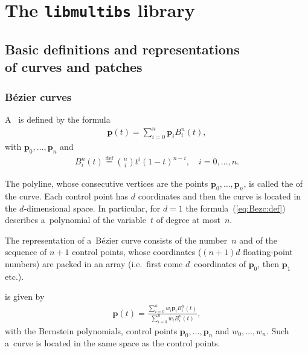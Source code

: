 

\chapter{The \texttt{libmultibs} library}

\section[Basic definitions and representations of curves and patches]%
{Basic definitions and representations \\ of curves and patches}

\subsection{B\'{e}zier curves}

A~ is defined by the formula
\begin{align}\label{eq:Bezc:def}
  \bm{p}(t) = \sum_{i=0}^n \bm{p}_iB^n_i(t),
\end{align}
with  $\bm{p}_0,\ldots,\bm{p}_n$
and 
\begin{align}
  B^n_i(t) \stackrel{\mathrm{def}}{=} \binom{n}{i}t^i(1-t)^{n-i},\quad
  i=0,\ldots,n.
\end{align}

The polyline, whose consecutive vertices are the points
$\bm{p}_0,\ldots,\bm{p}_n$, is called the  of the curve.
Each control point has $d$ coordinates and then the curve is located in the
$d$-dimensional space. In particular, for $d=1$ the formula~(\ref{eq:Bezc:def})
describes a~polynomial of the variable~$t$ of degree at most~$n$.

The representation of a~B\'{e}zier curve consists of the number~$n$
and of the sequence of $n+1$ control points, whose coordinates
($(n+1)d$ floating-point numbers) are packed in an array
(i.e.\ first come $d$~coordinates of $\bm{p}_0$, then $\bm{p}_1$ etc.).

\vspace{\medskipamount}
 is given by
\begin{align}
  \bm{p}(t) =
  \frac{\sum_{i=0}^n w_i\bm{p}_i B^n_i(t)}{\sum_{i=0}^n w_iB^n_i(t)},
\end{align}
with the Bernstein polynomials, control points
$\bm{p}_0,\ldots,\bm{p}_n$ and  $w_0,\ldots,w_n$. Such a~curve is
located in the same space as the control points.

